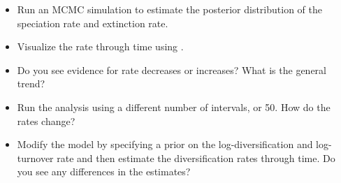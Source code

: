 \begin{itemize}
\item Run an MCMC simulation to estimate the posterior distribution of the speciation rate and extinction rate.
\item Visualize the rate through time using \R.
\item Do you see evidence for rate decreases or increases? What is the general trend?
\item Run the analysis using a different number of intervals,  or 50. How do the rates change?
\item Modify the model by specifying a prior on the log-diversification and log-turnover rate and then estimate the diversification rates through time. Do you see any differences in the estimates? 
\end{itemize}






